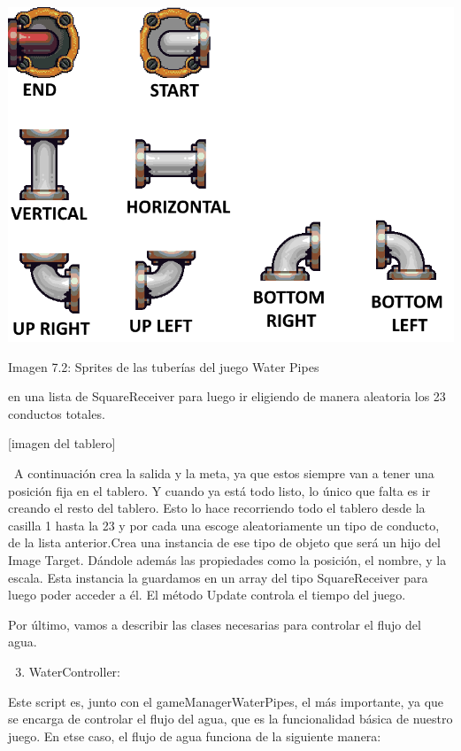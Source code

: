 \documentclass[]{article}
\begin{document}
\includegraphics{images/image05.png}

Imagen 7.2: Sprites de las tuberías del juego Water Pipes

en una lista de SquareReceiver para luego ir eligiendo de manera
aleatoria los 23 conductos totales.

{[}imagen del tablero{]}

~A continuación crea la salida y la meta, ya que estos siempre van a
tener una posición fija en el tablero. Y cuando ya está todo listo, lo
único que falta es ir creando el resto del tablero. Esto lo hace
recorriendo todo el tablero desde la casilla 1 hasta la 23 y por cada
una escoge aleatoriamente un tipo de conducto, de la lista anterior.Crea
una instancia de ese tipo de objeto que será un hijo del Image Target.
Dándole además las propiedades como la posición, el nombre, y la escala.
Esta instancia la guardamos en un array del tipo SquareReceiver para
luego poder acceder a él. El método Update controla el tiempo del juego.

Por último, vamos a describir las clases necesarias para controlar el
flujo del agua.

\begin{enumerate}
\setcounter{enumi}{2}
\itemsep1pt\parskip0pt
\item
  WaterController:
\end{enumerate}

Este script es, junto con el gameManagerWaterPipes, el más importante,
ya que se encarga de controlar el flujo del agua, que es la
funcionalidad básica de nuestro juego. En etse caso, el flujo de agua
funciona de la siguiente manera:
\end{document}
